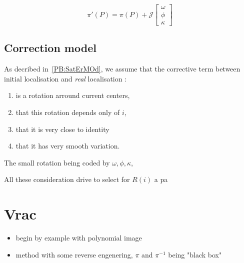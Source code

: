 \begin{equation}
	 \pi'(P) =  \pi(P)  + \mathcal{J} \begin{bmatrix} \omega \\ \phi \\ \kappa  \end{bmatrix}
\end{equation}


\subsection{Correction model}

As decribed in~\ref{PB:SatErMOd}, we assume that the corrective term between
initial localisation and \emph{real} localisation :

\begin{enumerate}
        \item  is a rotation arround current centers, 
	\item  that this rotation depends only of $i$,
	\item  that it  is very close to identity 
	\item  that it  has very smooth variation.
\end{enumerate}

The small rotation being coded by $\omega,\phi,\kappa$,

All these consideration  drive to select for $R(i)$ a pa

\section{Vrac}

\begin{itemize}
    \item begin by example with polynomial image
    \item method with some reverse engenering,  $\pi$ and $\pi^{-1}$ being "black box"
\end{itemize}



